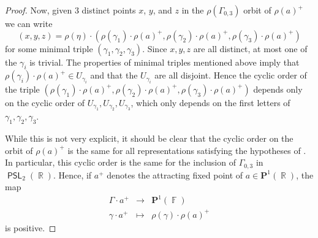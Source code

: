 \documentclass{amsart}
\theoremstyle{plain}
\theoremstyle{definition}
\DeclareMathOperator{\PSL}{\mathsf{PSL}}
\DeclareMathOperator{\Fb}{{\mathbb{F}}}
\DeclareMathOperator{\Rb}{{\mathbb{R}}}
\newcommand{\1}{\mathbf{1}}
\begin{document}
\begin{proof}
    Now, given $3$ distinct points $x$, $y$, and $z$ in the $\rho(\Gamma_{0,3})$ orbit of $\rho(a)^+$ we can write
    \[(x,y,z) = \rho(\eta)\cdot (\rho(\gamma_1)\cdot \rho(a)^+,\rho(\gamma_2)\cdot \rho(a)^+,\rho(\gamma_3)\cdot \rho(a)^+)\]
    for some minimal triple $(\gamma_1,\gamma_2, \gamma_3)$. Since $x,y,z$ are all distinct, at most one of the $\gamma_i$ is trivial.
    The properties of minimal triples mentioned above imply that $\rho(\gamma_i)\cdot \rho(a)^+ \in U_{\gamma_i}$ and that the $U_{\gamma_i}$ are all disjoint. Hence the cyclic order of the triple $(\rho(\gamma_1)\cdot \rho(a)^+,\rho(\gamma_2)\cdot \rho(a)^+,\rho(\gamma_3)\cdot \rho(a)^+)$ depends only on the cyclic order of $U_{\gamma_1}, U_{\gamma_2}, U_{\gamma_3}$, which only depends on the first letters of $\gamma_1,\gamma_2,\gamma_3$.

    While this is not very explicit, it should be clear that the cyclic order on the orbit of $\rho(a)^+$ is the same for all representations satisfying the hypotheses of . In particular, this cyclic order is the same for the inclusion of $\Gamma_{0,3}$ in $\PSL_2(\Rb)$. Hence, if $a^+$ denotes the attracting fixed point of $a \in \mathbf{P}^1(\Rb)$, the map
    \[
    \begin{array}{ccc}
    \Gamma \cdot a^+ & \to & \mathbf{P}^1(\Fb)\\
    \gamma \cdot a^+ & \mapsto & \rho(\gamma) \cdot \rho(a)^+
    \end{array}
    \]
    is positive.
    \end{proof}
\end{document}
